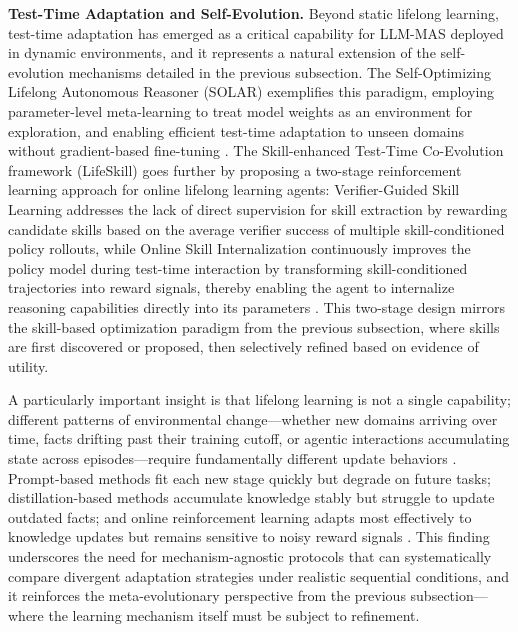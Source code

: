 \documentclass[11pt]{article}
\begin{document}
\textbf{Test-Time Adaptation and Self-Evolution.} Beyond static lifelong learning, test-time adaptation has emerged as a critical capability for LLM-MAS deployed in dynamic environments, and it represents a natural extension of the self-evolution mechanisms detailed in the previous subsection. The Self-Optimizing Lifelong Autonomous Reasoner (SOLAR) exemplifies this paradigm, employing parameter-level meta-learning to treat model weights as an environment for exploration, and enabling efficient test-time adaptation to unseen domains without gradient-based fine-tuning \cite{ref175}. The Skill-enhanced Test-Time Co-Evolution framework (LifeSkill) goes further by proposing a two-stage reinforcement learning approach for online lifelong learning agents: Verifier-Guided Skill Learning addresses the lack of direct supervision for skill extraction by rewarding candidate skills based on the average verifier success of multiple skill-conditioned policy rollouts, while Online Skill Internalization continuously improves the policy model during test-time interaction by transforming skill-conditioned trajectories into reward signals, thereby enabling the agent to internalize reasoning capabilities directly into its parameters \cite{ref176}. This two-stage design mirrors the skill-based optimization paradigm from the previous subsection, where skills are first discovered or proposed, then selectively refined based on evidence of utility.

A particularly important insight is that lifelong learning is not a single capability; different patterns of environmental change---whether new domains arriving over time, facts drifting past their training cutoff, or agentic interactions accumulating state across episodes---require fundamentally different update behaviors \cite{ref177}. Prompt-based methods fit each new stage quickly but degrade on future tasks; distillation-based methods accumulate knowledge stably but struggle to update outdated facts; and online reinforcement learning adapts most effectively to knowledge updates but remains sensitive to noisy reward signals \cite{ref177}. This finding underscores the need for mechanism-agnostic protocols that can systematically compare divergent adaptation strategies under realistic sequential conditions, and it reinforces the meta-evolutionary perspective from the previous subsection---where the learning mechanism itself must be subject to refinement.
\end{document}

